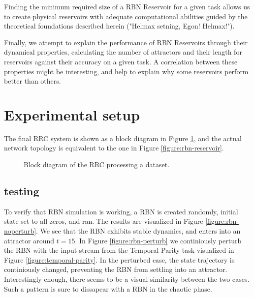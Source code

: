 Finding the minimum required size of a RBN Reservoir for a given task allows us to create physical reservoirs with adequate computational abilities guided by the theoretical foundations described herein ("Helmax setning, Egon! Helmax!").

Finally, we attempt to explain the performance of RBN Reservoirs through their dynamical properties,
calculating the number of attractors and their length for reservoirs against their accuracy on a given task.
A correlation between these properties might be interesting, and help to explain why some reservoirs perform better than others.

\section{Experimental setup}

The final RRC system is shown as a block diagram in Figure \ref{figure:rrc-block},
and the actual network topology is equivalent to the one in Figure \ref{figure:rbn-reservoir}.

\begin{figure}
  \centering
  \caption{Block diagram of the RRC processing a dataset.}
  \label{figure:rrc-block}
\end{figure}

\subsection{testing}

To verify that RBN simulation is working,
a RBN is created randomly, initial state set to all zeros, and ran.
The results are visualized in Figure \ref{figure:rbn-noperturb}.
We see that the RBN exhibits stable dynamics, and enters into an attractor around $t=15$.
In Figure \ref{figure:rbn-perturb} we continiously perturb the RBN with the input stream from the Temporal Parity task visualized in Figure \ref{figure:temporal-parity}.
In the perturbed case, the state trajectory is continiously changed, preventing the RBN from settling into an attractor.
Interestingly enough, there seems to be a visual similarity between the two cases.
Such a pattern is sure to dissapear with a RBN in the chaotic phase.

